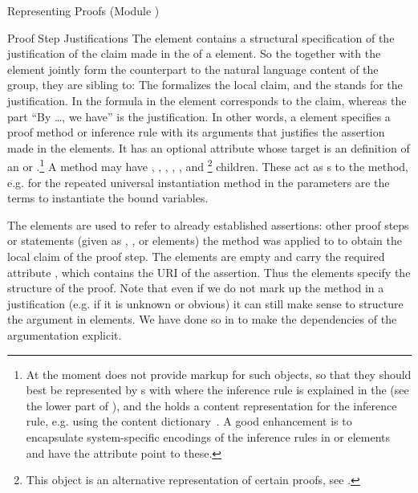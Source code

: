 \begin{tchapter}[id=proofs,short=Representing Proofs]{Representing Proofs (Module {})}
\begin{tsection}[id=proofs:justifications]{Proof Step Justifications}
  The {} element contains a structural specification of the justification of
  the claim made in the {} of a {} element. So the
  {} together with the {} element jointly form the
  counterpart to the natural language content of the {} group, they are
  sibling to: The {} formalizes the local claim, and the {}
  stands for the justification. In {} the formula in the {}
  element corresponds to the claim, whereas the part ``By \ldots, we have'' is the
  justification. In other words, a {} element specifies a proof method or
  inference rule with its arguments that justifies the assertion made in the
  {} elements.  It has an optional {} attribute whose
  target is an {\omdoc} definition of an {} or
  {}.\footnote{At the moment {\omdoc} does not provide markup for
    such objects, so that they should best be represented by {}s with
    {} where the inference rule is explained in the {}
    (see the lower part of {}), and the {} holds a content
    representation for the inference rule, e.g.  using the content
    dictionary~\cite{CD:inference-rules}.  A good enhancement is to encapsulate
    system-specific encodings of the inference rules in {} or
    {} elements and have the {} attribute point to
    these.} A method may have {}, {},
  {}, {}, {}, and
  {}\footnote{This object is an alternative representation of certain
    proofs, see {}.} children.  These act as
  {}s to the method, e.g. for the repeated universal instantiation
  method in {} the parameters are the terms to instantiate the bound
  variables.
  
  The {} elements are used to refer to already established assertions:
  other proof steps or statements (given as {}, {},
  or {} elements) the method was applied to to obtain the local claim of
  the proof step. The {} elements are empty and carry the required
  attribute {}, which contains the URI of the assertion.  Thus
  the {} elements specify the {} structure of the
  proof. Note that even if we do not mark up the method in a justification (e.g. if it is
  unknown or obvious) it can still make sense to structure the argument in
  {} elements. We have done so in {} to make
  the dependencies of the argumentation explicit.
   

\end{tsection}
\end{tchapter}
